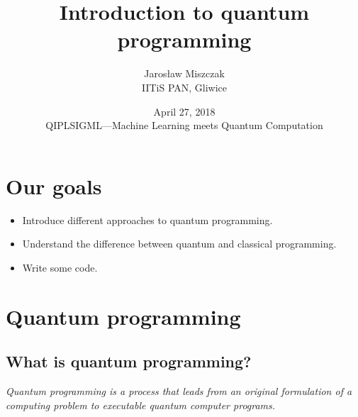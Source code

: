 \documentclass{beamer}
\title[A]{Introduction to quantum programming}
\author{Jaros\l aw Miszczak\\ IITiS PAN, Gliwice}
\date{April 27, 2018\\ QIPLSIGML---Machine Learning meets Quantum Computation}
\begin{document}
\begin{frame}{}
   \maketitle 
\end{frame}

\begin{frame}{}
    
  \tableofcontents[hideallsubsections]
\end{frame}



\section{Our goals}

\begin{frame}{\insertsection}{\insertsubsection}
    \begin{itemize}
        \item<1-> Introduce different approaches to quantum programming.
        \item<2-> Understand the difference between quantum and classical 
        programming.
        \item<3-> Write some code.\\ 
    \end{itemize}
\end{frame}


\section{Quantum programming}

\subsection{What is quantum programming?}
\begin{frame}{\insertsection}{\insertsubsection}
    
\emph{Quantum programming is a process that leads from an 
original formulation of a computing problem to executable quantum computer 
programs.}
\end{frame}
\end{document}
